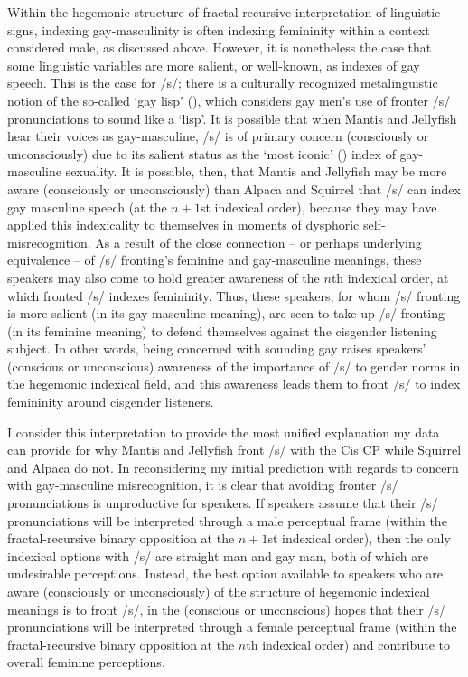 \documentclass[12pt,twoside]{reedthesis}
\begin{document}
Within the hegemonic structure of fractal-recursive interpretation of linguistic signs, indexing gay-masculinity is often indexing femininity within a context considered male, as discussed above. However, it is nonetheless the case that some linguistic variables are more salient, or well-known, as indexes of gay speech. This is the case for /s/; there is a culturally recognized metalinguistic notion of the so-called `gay lisp' (\cite{calder_from_2020}), which considers gay men's use of fronter /s/ pronunciations to sound like a `lisp'. It is possible that when Mantis and Jellyfish hear their voices as gay-masculine, /s/ is of primary concern (consciously or unconsciously) due to its salient status as the `most iconic' (\cite{calder_from_2020}) index of gay-masculine sexuality. It is possible, then, that Mantis and Jellyfish may be more aware (consciously or unconsciously) than Alpaca and Squirrel that /s/ can index gay masculine speech (at the $n + 1$st indexical order), because they may have applied this indexicality to themselves in moments of dysphoric self-misrecognition. As a result of the close connection -- or perhaps underlying equivalence -- of /s/ fronting's feminine and gay-masculine meanings, these speakers may also come to hold greater awareness of the $n$th indexical order, at which fronted /s/ indexes femininity. Thus, these speakers, for whom /s/ fronting is more salient (in its gay-masculine meaning), are seen to take up /s/ fronting (in its feminine meaning) to defend themselves against the cisgender listening subject. In other words, being concerned with sounding gay raises speakers' (conscious or unconscious) awareness of the importance of /s/ to gender norms in the hegemonic indexical field, and this awareness leads them to front /s/ to index femininity around cisgender listeners.

I consider this interpretation to provide the most unified explanation my data can provide for why Mantis and Jellyfish front /s/ with the Cis CP while Squirrel and Alpaca do not. In reconsidering my initial prediction with regards to concern with gay-masculine misrecognition, it is clear that avoiding fronter /s/ pronunciations is unproductive for speakers. If speakers assume that their /s/ pronunciations will be interpreted through a male perceptual frame (within the fractal-recursive binary opposition at the $n + 1$st indexical order), then the only indexical options with /s/ are straight man and gay man, both of which are undesirable perceptions. Instead, the best option available to speakers who are aware (consciously or unconsciously) of the structure of hegemonic indexical meanings is to front /s/, in the (conscious or unconscious) hopes that their /s/ pronunciations will be interpreted through a female perceptual frame (within the fractal-recursive binary opposition at the $n$th indexical order) and contribute to overall feminine perceptions.
\end{document}

